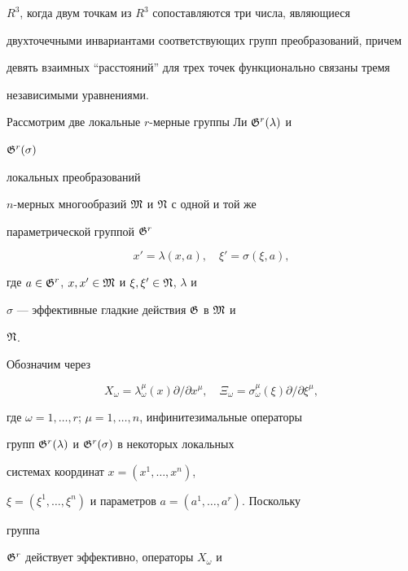 $R^3$, когда двум точкам из $R^3$ сопоставляются три числа, являющиеся 


двухточечными инвариантами соответствующих групп преобразований, причем 


девять взаимных ``расстояний'' для трех точек функционально связаны тремя 


независимыми уравнениями. 


 


Рассмотрим две локальные $r$-мерные группы Ли $\frak G^r(\lambda)$ и 


$\frak G^r(\sigma)$ 


локальных преобразований 


$n$-мерных многообразий $\frak M$ и $\frak N$ с одной и той же 


параметрической группой $\frak G^r$


\begin{equation} 


x'=\lambda(x,a),\quad \xi'=\sigma(\xi,a), 


\end{equation} 


где $a\in\frak G^r$, $x,x'\in\frak M$ и $\xi,\xi'\in\frak N$, $\lambda$ и 


$\sigma$ --- эффективные гладкие действия $\frak G$ в $\frak M$ и 


$\frak N$. 


 


Обозначим через 


\begin{equation} 


X_\omega=\lambda^\mu_\omega(x)\partial/\partial x^\mu,\quad 


\Xi_\omega=\sigma^\mu_\omega(\xi)\partial/\partial\xi^\mu, 


\end{equation} 


где $\omega=1,\dotsc,r$; $\mu=1,\dotsc,n$, инфинитезимальные операторы 


групп $\frak G^r(\lambda)$ и $\frak G^r(\sigma)$ в некоторых локальных 


системах координат $x=(x^1,\dotsc,x^n)$, 


$\xi=(\xi^1,\dotsc,\xi^n)$ и параметров $a=(a^1,\dotsc,a^r)$. Поскольку 


группа 


$\frak G^r$ действует эффективно, операторы $X_\omega$ и 


